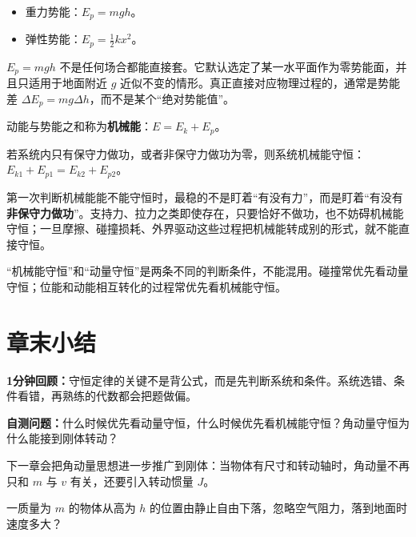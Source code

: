 \documentclass[lang=cn,11pt]{elegantbook}
\newcommand{\bridge}[1]{\begin{note}#1\end{note}}
\newcommand{\summaryline}[1]{\par\noindent\textbf{1分钟回顾：}#1\par}
\newcommand{\chapterselfcheck}[1]{\par\noindent\textbf{自测问题：}#1\par}
\begin{document}
\begin{itemize}
  \item 重力势能：\(E_p=mgh\)。
  \item 弹性势能：\(E_p=\frac{1}{2}kx^2\)。
\end{itemize}

\begin{note}
\(E_p=mgh\) 不是任何场合都能直接套。它默认选定了某一水平面作为零势能面，并且只适用于地面附近 \(g\) 近似不变的情形。真正直接对应物理过程的，通常是势能差 \(\Delta E_p=mg\Delta h\)，而不是某个“绝对势能值”。
\end{note}

\begin{definition}[机械能]\label{def:mechanical-energy}
动能与势能之和称为\textbf{机械能}：\(\displaystyle E=E_k+E_p\)。
\end{definition}

\begin{theorem}[机械能守恒定律]\label{thm:mechanical-energy-conservation}
若系统内只有保守力做功，或者非保守力做功为零，则系统机械能守恒：\(\displaystyle E_{k1}+E_{p1}=E_{k2}+E_{p2}\)。
\end{theorem}

\begin{note}
第一次判断机械能能不能守恒时，最稳的不是盯着“有没有力”，而是盯着“有没有\textbf{非保守力做功}”。支持力、拉力之类即使存在，只要恰好不做功，也不妨碍机械能守恒；一旦摩擦、碰撞损耗、外界驱动这些过程把机械能转成别的形式，就不能直接守恒。
\end{note}

\begin{remark}
“机械能守恒”和“动量守恒”是两条不同的判断条件，不能混用。碰撞常优先看动量守恒；位能和动能相互转化的过程常优先看机械能守恒。
\end{remark}

\section{章末小结}

\summaryline{守恒定律的关键不是背公式，而是先判断系统和条件。系统选错、条件看错，再熟练的代数都会把题做偏。}
\chapterselfcheck{什么时候优先看动量守恒，什么时候优先看机械能守恒？角动量守恒为什么能接到刚体转动？}
\bridge{下一章会把角动量思想进一步推广到刚体：当物体有尺寸和转动轴时，角动量不再只和 \(m\) 与 \(v\) 有关，还要引入转动惯量 \(J\)。}

\begin{exercise}[]
一质量为 \(m\) 的物体从高为 \(h\) 的位置由静止自由下落，忽略空气阻力，落到地面时速度多大？
\end{exercise}
\end{document}
